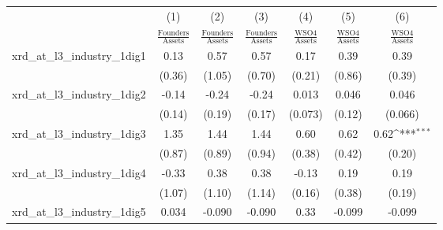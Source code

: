 {
\def\sym#1{\ifmmode^{#1}\else\(^{#1}\)\fi}
\begin{tabular}{l*{6}{c}}
\toprule
                    &\multicolumn{1}{c}{(1)}&\multicolumn{1}{c}{(2)}&\multicolumn{1}{c}{(3)}&\multicolumn{1}{c}{(4)}&\multicolumn{1}{c}{(5)}&\multicolumn{1}{c}{(6)}\\
                    &\multicolumn{1}{c}{$\frac{\textrm{Founders}}{\textrm{Assets}}$}&\multicolumn{1}{c}{$\frac{\textrm{Founders}}{\textrm{Assets}}$}&\multicolumn{1}{c}{$\frac{\textrm{Founders}}{\textrm{Assets}}$}&\multicolumn{1}{c}{$\frac{\textrm{WSO4}}{\textrm{Assets}}$}&\multicolumn{1}{c}{$\frac{\textrm{WSO4}}{\textrm{Assets}}$}&\multicolumn{1}{c}{$\frac{\textrm{WSO4}}{\textrm{Assets}}$}\\
\midrule
xrd\_at\_l3\_industry\_1dig1&        0.13         &        0.57         &        0.57         &        0.17         &        0.39         &        0.39         \\
                    &      (0.36)         &      (1.05)         &      (0.70)         &      (0.21)         &      (0.86)         &      (0.39)         \\
\addlinespace
xrd\_at\_l3\_industry\_1dig2&       -0.14         &       -0.24         &       -0.24         &       0.013         &       0.046         &       0.046         \\
                    &      (0.14)         &      (0.19)         &      (0.17)         &     (0.073)         &      (0.12)         &     (0.066)         \\
\addlinespace
xrd\_at\_l3\_industry\_1dig3&        1.35         &        1.44         &        1.44         &        0.60         &        0.62         &        0.62\sym{***}\\
                    &      (0.87)         &      (0.89)         &      (0.94)         &      (0.38)         &      (0.42)         &      (0.20)         \\
\addlinespace
xrd\_at\_l3\_industry\_1dig4&       -0.33         &        0.38         &        0.38         &       -0.13         &        0.19         &        0.19         \\
                    &      (1.07)         &      (1.10)         &      (1.14)         &      (0.16)         &      (0.38)         &      (0.19)         \\
\addlinespace
xrd\_at\_l3\_industry\_1dig5&       0.034         &      -0.090         &      -0.090         &        0.33         &      -0.099         &      -0.099         \\

\end{tabular}}
